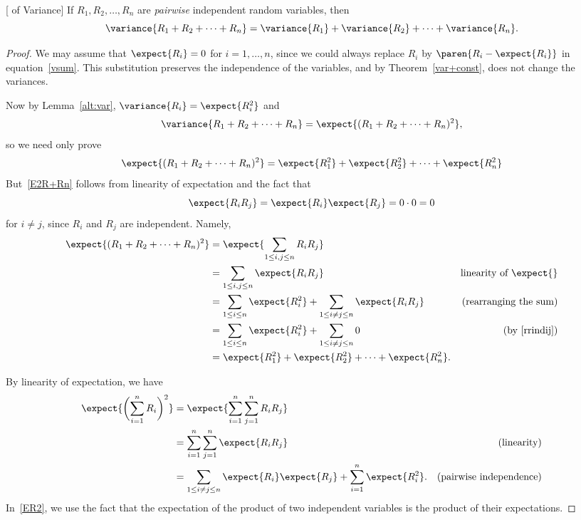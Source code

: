\begin{theorem}\label{thm:variance_additivity}[ of
  Variance]
  If $R_1, R_2, \dots, R_n$ are 
  \emph{pairwise} independent random variables, then
\begin{equation}\label{vsum}
\variance{R_1 + R_2 + \cdots + R_n} = \variance{R_1} + \variance{R_2} +
  \cdots + \variance{R_n}.
\end{equation}
\end{theorem}
\begin{editingnotes}

\begin{proof}
  We may assume that $\expect{R_i} = 0$ for $i=1,\dots,n$, since we could
  always replace $R_i$ by $\paren{R_i-\expect{R_i}}$ in
  equation~\eqref{vsum}.  This substitution preserves the independence of
  the variables, and by Theorem~\ref{var+const}, does not change the
  variances.

  Now by Lemma~\ref{alt:var}, $\variance{R_i} = \expect{R_i^2}$ and
\[
\variance{R_1+R_2+\cdots+R_n} = \expect{(R_1+R_2+\cdots+R_n)^2},
\]
so we need only prove
\begin{equation}\label{E2R+Rn}
\expect{(R_1+R_2+\cdots+R_n)^2} = \expect{R_1^2} + \expect{R_2^2} + \cdots
+ \expect{R_n^2}
\end{equation}
But~\eqref{E2R+Rn} follows from linearity of expectation and the fact that
\begin{equation}\label{rrindij}
\expect{R_iR_j} = \expect{R_i}\expect{R_j} = 0 \cdot 0 = 0
\end{equation}
for $i \neq j$, since $R_i$ and $R_j$ are independent.  Namely,
\begin{align*}
\expect{(R_1+R_2+\cdots+R_n)^2}
   & = \expect{\sum_{1\leq i,j \leq n} R_iR_j}\\
   & = \sum_{1\leq i,j \leq n} \expect{R_iR_j} & \text{linearity of $\expect{}$}\\
   & = \sum_{1 \leq i \leq n} \expect{R_i^2}
             + \sum_{1 \leq i \neq j \leq n} \expect{R_iR_j} &
             \text{(rearranging the sum)}\\
   & = \sum_{1 \leq i \leq n} \expect{R_i^2}
            + \sum_{1 \leq i \neq j \leq n} 0
             & \text{(by~\eqref{rrindij})}\\
   & =  \expect{R_1^2} + \expect{R_2^2} + \cdots + \expect{R_n^2}.
\end{align*}


\iffalse
By linearity of expectation, we have
\begin{align}
\expect{\biggl(\sum_{i=1}^n R_i\biggr)^2} &
    = \expect{\sum_{i=1}^n \sum_{j=1}^n R_i R_j} \notag\\
   &  = \sum_{i=1}^n \sum_{j=1}^n \expect{R_i R_j} & \text{(linearity)}\notag\\
   & = \sum_{1\le i \neq j \le n} \expect{R_i}\expect{R_j} + \sum_{i=1}^n
     \expect{R_i^2}.
       & \text{(pairwise independence)} \label{ER2}
\end{align}
In~\eqref{ER2}, we use the fact that the expectation
of the product of two independent variables is the product of their
expectations.


\end{proof}
\end{editingnotes}
